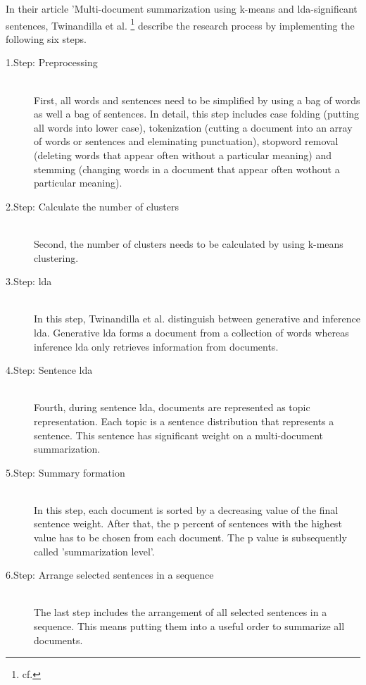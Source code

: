 In their article 'Multi-document summarization using k-means and \ac{lda}-significant sentences, Twinandilla et al. \footnote{cf.\autocite{twinandilla_2018}} describe the research process by implementing the following six steps.

\begin{description}
\item[1.Step: Preprocessing]\hfill \\
First, all words and sentences need to be simplified by using a bag of words as well a bag of sentences. In detail, this step includes case folding (putting all words into lower case), tokenization (cutting a document into an array of words or sentences and eleminating punctuation), stopword removal (deleting words that appear often without a particular meaning) and stemming (changing words in a document that appear often wothout a particular meaning).

\item[2.Step: Calculate the number of clusters]\hfill \\
Second, the number of clusters needs to be calculated by using k-means clustering. 

\item[3.Step: \ac{lda}]\hfill \\
In this step, Twinandilla et al. distinguish between generative and inference \ac{lda}. Generative \ac{lda} forms a document from a collection of words whereas inference \ac{lda} only retrieves information from documents.

\item[4.Step: Sentence \ac{lda}]\hfill \\
Fourth, during sentence \ac{lda}, documents are represented as topic representation. Each topic is a sentence distribution that represents a sentence. This sentence has significant weight on a multi-document summarization.

\item[5.Step: Summary formation]\hfill \\
In this step, each document is sorted by a decreasing value of the final sentence weight. After that, the p percent of sentences with the highest value has to be chosen from each document. The p value is subsequently called 'summarization level'.

\item[6.Step: Arrange selected sentences in a sequence]\hfill \\
The last step includes the arrangement of all selected sentences in a sequence. This means putting them into a useful order to summarize all documents.
\end{description}

